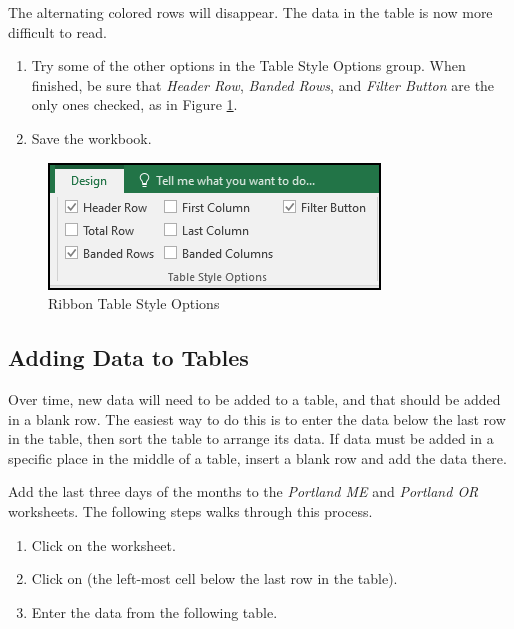 The alternating colored rows will disappear. The data in the table is now more difficult to read.

\begin{enumerate}[resume]
	\item Try some of the other options in the Table Style Options group. When finished, be sure that \textit{Header Row}, \textit{Banded Rows}, and \textit{Filter Button} are the only ones checked, as in Figure \ref{05:fig05}.
	\item Save the  workbook.
\end{enumerate}

\begin{figure}[H]
	\centering
	\includegraphics[width=\maxwidth{.65\linewidth}]{gfx/ch05_fig05}
	\caption{Ribbon Table Style Options}
	\label{05:fig05}
\end{figure}

\subsection{Adding Data to Tables}

Over time, new data will need to be added to a table, and that should be added in a blank row. The easiest way to do this is to enter the data below the last row in the table, then sort the table to arrange its data. If data must be added in a specific place in the middle of a table, insert a blank row and add the data there.

Add the last three days of the months to the \textit{Portland ME} and \textit{Portland OR} worksheets. The following steps walks through this process.

\begin{enumerate}
	\item Click on the  worksheet.
	\item Click on  (the left-most cell below the last row in the table).
	\item Enter the data from the following table.
\end{enumerate}

